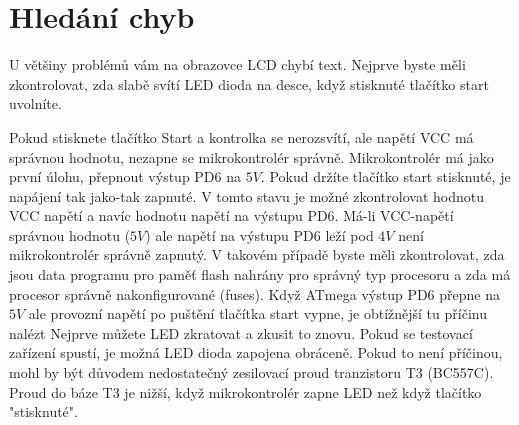 \section{Hledání chyb}
U většiny problémů vám na obrazovce LCD chybí text.
Nejprve byste měli zkontrolovat, zda slabě svítí LED dioda na desce, když stisknuté tlačítko start
uvolníte.

\begin{description} \setlength{\itemsep}{0em}

\item[Zařízení se nezapne]  
Pokud stisknete tlačítko Start a kontrolka se nerozsvítí, ale napětí VCC má správnou hodnotu,
nezapne se mikrokontrolér správně.
Mikrokontrolér má jako první úlohu, přepnout výstup PD6 na \(5V\).
Pokud držíte tlačítko start stisknuté, je napájení tak jako-tak zapnuté.
V tomto stavu je možné zkontrolovat hodnotu VCC napětí a navíc hodnotu napětí na výstupu PD6.
Má-li VCC-napětí správnou hodnotu (\(5V\)) ale napětí na výstupu PD6 leží pod \(4V\) není
mikrokontrolér správně zapnutý.
V takovém případě byste měli zkontrolovat, zda jsou data programu pro paměť flash nahrány
pro správný typ procesoru a zda má procesor správně nakonfigurované (fuses).
Když ATmega výstup PD6 přepne na \(5V\) ale provozní napětí po puštění tlačítka start vypne,
je obtížnější tu příčinu nalézt Nejprve můžete LED zkratovat a zkusit to znovu.
Pokud se testovací zařízení spustí, je možná LED dioda zapojena obráceně.
Pokud to není příčinou, mohl by být důvodem nedostatečný zesilovací proud tranzistoru T3 (BC557C).
Proud do báze T3 je nižší, když mikrokontrolér zapne LED než když tlačítko "stisknuté".


\end{description}
